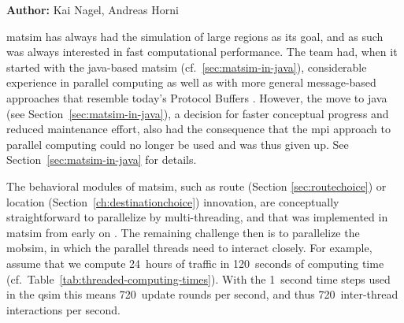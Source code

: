 \hfill \textbf{Author:} Kai Nagel, Andreas Horni


\gls{matsim} has always had the simulation of large regions as its goal, and as such was always interested in fast computational performance.  The team had, when it started with the \gls{java}-based \gls{matsim} (cf.~\ref{sec:matsim-in-java}), considerable experience in parallel computing \citep{NagelSchleicher1994Microscopictrafficmodeling,RickertNagel1999hpcn99,NagelRickert2001parallel,CetinBurriNagel2003queue} as well as with more general message-based approaches \citep{GloorNagel2005ped-att04-birkh} that resemble today's Protocol Buffers \citep{ProtocolBuffersWww}.
%
However, the move to \gls{java} (see Section~\ref{sec:matsim-in-java}), a decision for faster conceptual progress and reduced maintenance effort, also had the consequence that the \gls{mpi} approach to parallel computing could no longer be used and was thus given up.  See Section~\ref{sec:matsim-in-java} for details.



The behavioral modules of \gls{matsim}, such as route (Section \ref{sec:routechoice}) or location (Section~\ref{ch:destinationchoice}) innovation, are conceptually straightforward to parallelize by multi-threading, and that was implemented in \gls{matsim} from early on \citep[][see Section~\ref{sec:using-parallel-computing} how to use this]{BalmerEtc2008matsim-arch-perf-MAS-TT}.  The remaining challenge then is to parallelize the \gls{mobsim}, in which the parallel threads need to interact closely.  For example, assume that we compute 24~hours of traffic in 120~seconds of computing time (cf.~Table~\ref{tab:threaded-computing-times}).  With the 1~second time steps used in the \gls{qsim} this means 720~update rounds per second, and thus 720~inter-thread interactions per second.


